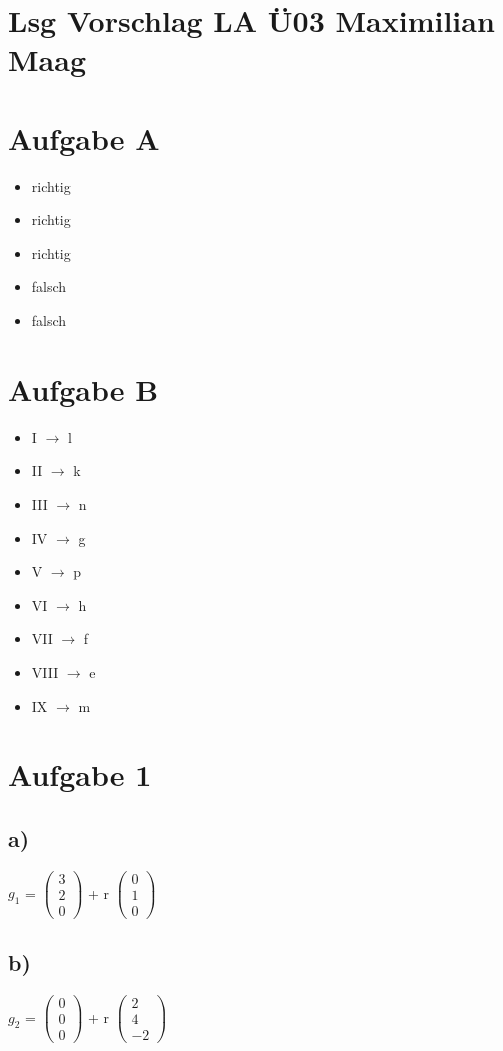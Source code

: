 \documentclass{article}
\begin{document}
	\section*{Lsg Vorschlag LA Ü03 Maximilian Maag}
	\section*{Aufgabe A}
	\begin{itemize}
		\item richtig
		\item richtig
		\item richtig
		\item falsch
		\item falsch
	\end{itemize}
	\section*{Aufgabe B}
	\begin{itemize}
		\item I $\to$ l
		\item II $\to$ k 
		\item III $\to$ n
		\item IV $\to$ g 
		\item V $\to$ p
		\item VI $\to$ h
		\item VII $\to$ f
		\item VIII $\to$ e
		\item IX $\to$ m
	\end{itemize}
	\section*{Aufgabe 1}
	\subsection*{a)}
	$g_1$ = $\left(\begin{array}{c}
	3 \\ 2 \\ 0
	\end{array}\right) $
	+ r
	$\left(\begin{array}{c}
	0 \\ 1 \\ 0
	\end{array}\right) $
	\subsection*{b)}
	$g_2$ = 
	$\left(\begin{array}{c}
	0 \\ 0 \\ 0
	\end{array}\right)$
	+ r 
	$\left(\begin{array}{c}
	2 \\ 4 \\ -2
	\end{array}\right)$
\end{document}
